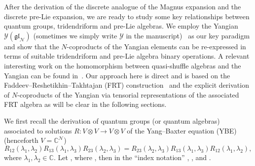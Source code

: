 \documentclass[pdftex]{sigma}
\numberwithin{equation}{section}
\theoremstyle{definition}
\DeclareMathOperator{\EEnd}{End}%
\begin{document}
 After the derivation of the discrete analogue of the Magnus expansion and the discrete pre-Lie expansion, we are ready to study some key relationships between quantum groups, tridendriform and pre-Lie algebras. We employ the Yangian ${\mathcal Y}(\mathfrak{gl}_{\mathcal N})$ (sometimes we simply write ${\mathcal Y}$ in the manuscript)~\cite{Chari, Drinfeld, Drinfeld1, Drinfeld2, Molev} as our key paradigm and show that the $N$-coproducts of the Yangian elements can be re-expressed in terms of suitable tridendriform and pre-Lie algebra binary operations. A relevant interesting work on the homomorphism between quasi-shuffle algebras and the Yangian can be found in~\cite{Hudson}.
Our approach here is direct and is based on the Faddeev--Reshetikhin--Takhtajan (FRT) construction~\cite{FadTakRes} and the explicit derivation of $N$-coproducts of the Yangian via tensorial representations of the associated FRT algebra as will be clear in the following sections.

We first recall the derivation of quantum groups (or quantum algebras) associated to solutions $R\colon V \otimes V \to V \otimes V $ of the Yang--Baxter equation (YBE)~\cite{Baxter, Yang} \big(henceforth $V = {\mathbb C}^{{\mathcal N}}$\big)
\begin{equation}
R_{12}(\lambda_1, \lambda_2)R_{13}(\lambda_1, \lambda_3)R_{23}(\lambda_2, \lambda_3)= R_{23}(\lambda_2, \lambda_3) R_{13}(\lambda_1, \lambda_3) R_{12}(\lambda_1,\lambda_2), \label{frt}
\end{equation}
where $\lambda_1, \lambda_2 \in {\mathbb C}$. Let , where \smash{${\mathrm a}_x, {\mathrm b}_x\in \EEnd\bigl({\mathbb C}^{\mathcal N}\bigr)$}, then in the ``index notation'' , , and .
\end{document}
